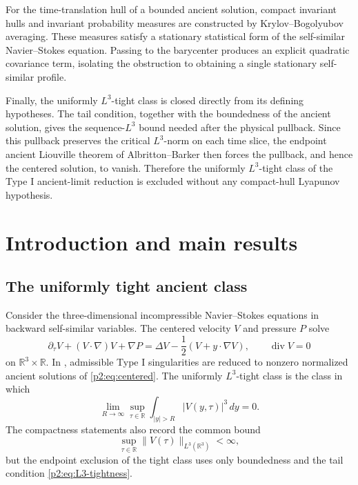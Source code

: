 \documentclass[11pt]{amsart}
\theoremstyle{plain}
\theoremstyle{definition}
\theoremstyle{remark}
\numberwithin{equation}{section}
\newcommand{\R}{\mathbb R}
\newcommand{\divergence}{\operatorname{div}}
\begin{document}
For the time-translation hull of a bounded ancient solution, compact invariant
hulls and invariant probability measures are constructed by
Krylov--Bogolyubov averaging.  These measures satisfy a stationary statistical form of the
self-similar Navier--Stokes equation.  Passing to the barycenter produces an
explicit quadratic covariance term, isolating the obstruction to obtaining a
single stationary self-similar profile.

Finally, the uniformly \(L^3\)-tight class is closed directly from its defining
hypotheses.  The tail condition, together with the boundedness of the ancient
solution, gives the sequence-\(L^3\) bound needed after the physical pullback.
Since this pullback preserves the critical \(L^3\)-norm on each time slice,
the endpoint ancient Liouville theorem of Albritton--Barker then forces the
pullback, and hence the centered solution, to vanish.  Therefore the uniformly
\(L^3\)-tight class of the Type I
ancient-limit reduction is excluded without any compact-hull Lyapunov
hypothesis.

\section{Introduction and main results}\label{p2:sec:introduction}

\subsection{The uniformly tight ancient class}

Consider the three-dimensional incompressible Navier--Stokes equations in
backward self-similar variables.  The centered velocity \(V\) and pressure \(P\)
solve
\begin{equation}\label{p2:eq:centered}
   \partial_\tau V+(V\cdot\nabla)V+\nabla P
   =
   \Delta V-\frac12(V+y\cdot\nabla V),
   \qquad \divergence V=0
\end{equation}
on \(\R^3\times\R\).  In , admissible Type I
singularities are reduced to nonzero normalized ancient solutions of
\eqref{p2:eq:centered}.  The uniformly \(L^3\)-tight class is the class in which
\begin{equation}\label{p2:eq:L3-tightness}
   \lim_{R\to\infty}
   \sup_{\tau\in\R}\int_{|y|>R}|V(y,\tau)|^3\,dy=0 .
\end{equation}
The compactness statements also record the common bound
\begin{equation}\label{p2:eq:L3-bound}
   \sup_{\tau\in\R}\|V(\tau)\|_{L^3(\R^3)}<\infty ,
\end{equation}
but the endpoint exclusion of the tight class uses only boundedness and the
tail condition \eqref{p2:eq:L3-tightness}.
\end{document}
